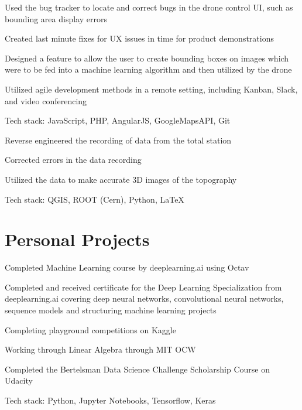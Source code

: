\documentclass[letterpaper]{resume}
\begin{document}
\begin{compactitem}
\item Used the bug tracker to locate and correct bugs in the drone control UI, such as bounding area display errors
\item Created last minute fixes for UX issues in time for product demonstrations
\item Designed a feature to allow the user to create bounding boxes on images which were to be fed into a machine learning algorithm and then utilized by the drone
\item Utilized agile development methods in a remote setting, including Kanban, Slack, and video conferencing
\item Tech stack: JavaScript, PHP, AngularJS, GoogleMapsAPI, Git
\end{compactitem}

\begin{compactitem}
\item Reverse engineered the recording of data from the total station
\item Corrected errors in the data recording
\item Utilized the data to make accurate 3D images of the topography
\item Tech stack: QGIS, ROOT (Cern), Python, LaTeX
\end{compactitem}

\section{Personal Projects}

\begin{compactitem}
\item Completed Machine Learning course by deeplearning.ai using Octav
\item Completed and received certificate for the Deep Learning Specialization from deeplearning.ai covering deep neural networks, convolutional neural networks, sequence models and structuring machine learning projects
\item Completing playground competitions on Kaggle
\item Working through Linear Algebra through MIT OCW
\item Completed the Bertelsman Data Science Challenge Scholarship Course on Udacity
\item Tech stack: Python, Jupyter Notebooks, Tensorflow, Keras
\end{compactitem}
\end{document}

